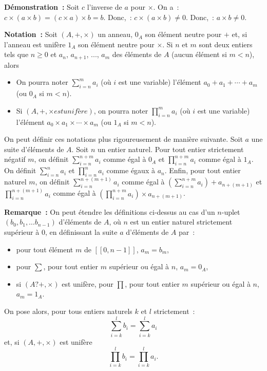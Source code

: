 \medskip

\noindent\textbf{Démonstration :} Soit $c$ l'inverse de $a$ pour $\times$.
    On a : $c \times (a \times b) = (c \times a) \times b = b$.
    Donc, : $c \times (a \times b) \neq 0$.
    Donc, : $a \times b \neq 0$.

    \done

\medskip

\noindent\textbf{Notation :} Soit $(A, +, \times)$ un anneau, $0_A$ son élément neutre pour $+$ et, si l'anneau est unifère $1_A$ son élément neutre pour $\times$.
    Si $n$ et $m$ sont deux entiers tels que $n \geq 0$ et $a_n$, $a_{n+1}$, ..., $a_m$ des éléments de $A$ (aucun élément si $m < n$), alors 
    \begin{itemize}[nosep]
        \item On pourra noter $\sum_{i=n}^m a_i$ (où $i$ est une variable) l'élément $a_0 + a_1 + \cdots + a_m$ (ou $0_A$ si $m < n$).
        \item Si $(A, +, \times est unifère)$, on pourra noter $\prod_{i=n}^m a_i$ (où $i$ est une variable) l'élément $a_0 \times a_1 \times \cdots \times a_m$ (ou $1_A$ si $m < n$).
    \end{itemize}
    On peut définir ces notations plus rigoureusement de manière suivante. 
    Soit $a$ une suite d'éléments de $A$.
    Soit $n$ un entier naturel.
    Pour tout entier strictement négatif $m$, on définit $\sum_{i=n}^{n+m} a_i$ comme égal à $0_A$ et $\prod_{i=n}^{n+m} a_i$ comme égal à $1_A$.
    On définit $\sum_{i=n}^n a_i$ et $\prod_{i=n}^n a_i$ comme égaux à $a_n$.
    Enfin, pour tout entier naturel $m$, on définit $\sum_{i=n}^{n+(m+1)} a_i$ comme égal à $\left( \sum_{i=n}^{n+m} a_i \right) + a_{n+(m+1)}$ et $\prod_{i=n}^{n+(m+1)} a_i$ comme égal à $\left( \prod_{i=n}^{n+m} a_i \right) \times a_{n+(m+1)}$.

\medskip

\noindent\textbf{Remarque :} On peut étendre les définitions ci-dessus au cas d'un $n$-uplet $(b_0, b_1, \dots b_{n-1})$ d'éléments de $A$, où $n$ est un entier naturel strictement supérieur à $0$, en définissant la suite $a$ d'éléments de $A$ par : 
\begin{itemize}[nosep]
    \item pour tout élément $m$ de $[\![0, n-1]\!]$, $a_m = b_m$, 
    \item pour $\sum$, pour tout entier $m$ supérieur ou égal à $n$, $a_m = 0_A$, 
    \item si $(A? +, \times)$ est unifère, pour $\prod$, pour tout entier $m$ supérieur ou égal à $n$, $a_m = 1_A$.
\end{itemize}
On pose alors, pour tous entiers naturels $k$ et $l$ strictement : 
\begin{equation*}
    \sum_{i=k}^l b_i = \sum_{i=k}^l a_i
\end{equation*}
et, si $(A, +, \times)$ est unifère
\begin{equation*}
    \prod_{i=k}^l b_i = \prod_{i=k}^l a_i.
\end{equation*}

